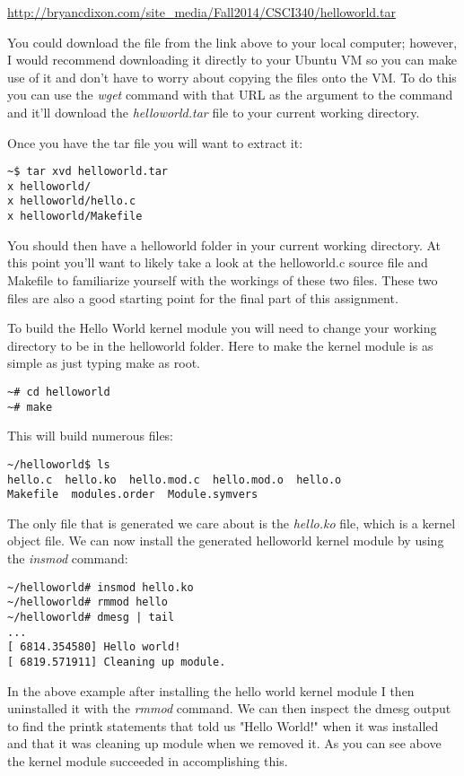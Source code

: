 \documentclass[11pt]{article}
\begin{document}
{\url{http://bryancdixon.com/site_media/Fall2014/CSCI340/helloworld.tar}}

You could download the file from the link above to your local computer; however, I would recommend downloading it directly to your Ubuntu VM so you can make use of it and don't have to worry about copying the files onto the VM. To do this you can use the {\it wget} command with that URL as the argument to the command and it'll download the {\it helloworld.tar} file to your current working directory.

Once you have the tar file you will want to extract it:

\begin{verbatim}
~$ tar xvd helloworld.tar
x helloworld/
x helloworld/hello.c
x helloworld/Makefile
\end{verbatim}

You should then have a helloworld folder in your current working directory. At this point you'll want to likely take a look at the helloworld.c source file and Makefile to familiarize yourself with the workings of these two files. These two files are also a good starting point for the final part of this assignment. 

To build the Hello World kernel module you will need to change your working directory to be in the helloworld folder. Here to make the kernel module is as simple as just typing make as root.

\begin{verbatim}
~# cd helloworld
~# make
\end{verbatim}

\newpage

This will build numerous files:

\begin{verbatim}
~/helloworld$ ls
hello.c  hello.ko  hello.mod.c  hello.mod.o  hello.o  
Makefile  modules.order  Module.symvers
\end{verbatim}

The only file that is generated we care about is the {\it hello.ko} file, which is a kernel object file. We can now install the generated helloworld kernel module by using the {\it insmod} command:

\begin{verbatim}
~/helloworld# insmod hello.ko
~/helloworld# rmmod hello
~/helloworld# dmesg | tail
...
[ 6814.354580] Hello world!
[ 6819.571911] Cleaning up module.
\end{verbatim}

In the above example after installing the hello world kernel module I then uninstalled it with the {\it rmmod} command. We can then inspect the dmesg output to find the printk statements that told us "Hello World!" when it was installed and that it was cleaning up module when we removed it. As you can see above the kernel module succeeded in accomplishing this.
\end{document}

